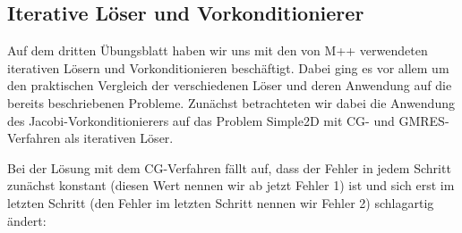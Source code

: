 \documentclass[12pt,a4paper]{scrartcl}
\newcommand{\R}{\mathbb{R}}
\DeclareMathOperator{\dive}{div}
\numberwithin{equation}{section}
\begin{document}
\begin{enumerate}[label=(\roman*)]
%




\end{enumerate}

\subsection{Iterative Löser und Vorkonditionierer}

Auf dem dritten Übungsblatt haben wir uns mit den von M++ verwendeten iterativen Lösern und Vorkonditionieren beschäftigt.
Dabei ging es vor allem um den praktischen Vergleich der verschiedenen Löser und deren Anwendung auf die bereits beschriebenen Probleme.
Zunächst betrachteten wir dabei die Anwendung des Jacobi-Vorkonditionierers auf das Problem Simple2D mit CG- und GMRES-Verfahren als iterativen Löser.

Bei der Lösung mit dem CG-Verfahren fällt auf, dass der Fehler in jedem Schritt zunächst konstant (diesen Wert nennen wir ab jetzt Fehler 1) ist und sich erst im letzten Schritt (den Fehler im letzten Schritt nennen wir Fehler 2) schlagartig ändert:
\end{document}

